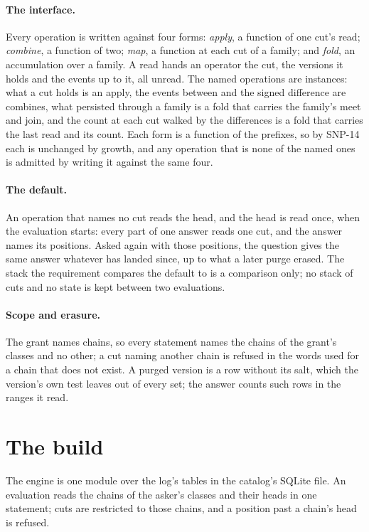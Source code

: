 \documentclass[11pt]{article}
\theoremstyle{plain}
\theoremstyle{definition}
\begin{document}
\paragraph{The interface.} Every operation is written against four forms: \emph{apply}, a
function of one cut's read; \emph{combine}, a function of two; \emph{map}, a function at each
cut of a family; and \emph{fold}, an accumulation over a family. A read hands an operator the cut,
the versions it holds and the events up to it, all unread. The named operations are instances:
what a cut holds is an apply, the events between and the signed difference are combines, what
persisted through a family is a fold that carries the family's meet and join, and the count at
each cut walked by the differences is a fold that carries the last read and its count. Each form
is a function of the prefixes, so by SNP-14 each is unchanged by growth, and any operation that
is none of the named ones is admitted by writing it against the same four.

\paragraph{The default.} An operation that names no cut reads the head, and the head is read once,
when the evaluation starts: every part of one answer reads one cut, and the answer names its
positions. Asked again with those positions, the question gives the same answer whatever has
landed since, up to what a later purge erased. The stack the requirement compares the default to
is a comparison only; no stack of cuts and no state is kept between two evaluations.

\paragraph{Scope and erasure.} The grant names chains, so every statement names the chains of the
grant's classes and no other; a cut naming another chain is refused in the words used for a chain
that does not exist. A purged version is a row without its salt, which the version's own test
leaves out of every set; the answer counts such rows in the ranges it read.

\section{The build}\label{sec:build}

The engine is one module over the log's tables in the catalog's SQLite file. An evaluation reads
the chains of the asker's classes and their heads in one statement; cuts are restricted to those
chains, and a position past a chain's head is refused.
\end{document}
